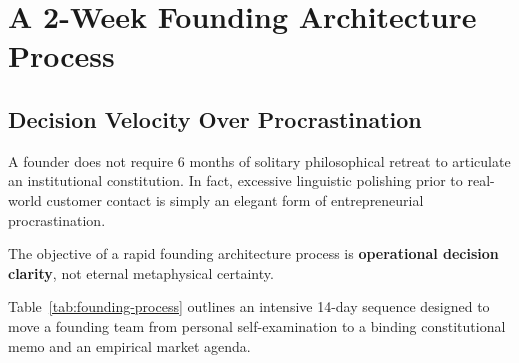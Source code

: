 \section{A 2-Week Founding Architecture Process}

\subsection{Decision Velocity Over Procrastination}

A founder does not require 6 months of solitary philosophical retreat to articulate an institutional constitution. In fact, excessive linguistic polishing prior to real-world customer contact is simply an elegant form of entrepreneurial procrastination.

The objective of a rapid founding architecture process is \textbf{operational decision clarity}, not eternal metaphysical certainty.

Table~\ref{tab:founding-process} outlines an intensive 14-day sequence designed to move a founding team from personal self-examination to a binding constitutional memo and an empirical market agenda.

